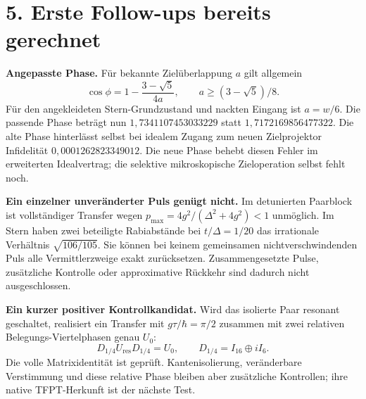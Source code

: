 \documentclass[11pt,a4paper,oneside,parskip=half,headings=normal]{scrreprt}
\begin{document}
\section*{5. Erste Follow-ups bereits gerechnet}
\textbf{Angepasste Phase.} Für bekannte Zielüberlappung $a$ gilt allgemein
\begin{equation}
\cos\phi=1-\frac{3-\sqrt5}{4a},\qquad
a\ge(3-\sqrt5)/8.
\end{equation}
Für den angekleideten Stern-Grundzustand und nackten Eingang ist $a=w/6$. Die passende Phase beträgt nun $1{,}7341107453033229$ statt $1{,}7172169856477322$. Die alte Phase hinterlässt selbst bei idealem Zugang zum neuen Zielprojektor Infidelität $0{,}0001262823349012$. Die neue Phase behebt diesen Fehler im erweiterten Idealvertrag; die selektive mikroskopische Zieloperation selbst fehlt noch.

\textbf{Ein einzelner unveränderter Puls genügt nicht.} Im detunierten Paarblock ist vollständiger Transfer wegen $p_{\max}=4g^2/(\Delta^2+4g^2)<1$ unmöglich. Im Stern haben zwei beteiligte Rabiabstände bei $t/\Delta=1/20$ das irrationale Verhältnis $\sqrt{106/105}$. Sie können bei keinem gemeinsamen nichtverschwindenden Puls alle Vermittlerzweige exakt zurücksetzen. Zusammengesetzte Pulse, zusätzliche Kontrolle oder approximative Rückkehr sind dadurch nicht ausgeschlossen.

\textbf{Ein kurzer positiver Kontrollkandidat.} Wird das isolierte Paar resonant geschaltet, realisiert ein Transfer mit $g\tau/\hbar=\pi/2$ zusammen mit zwei relativen Belegungs-Viertelphasen genau $U_0$:
\[
D_{1/4}U_{\mathrm{res}}D_{1/4}=U_0,\qquad D_{1/4}=I_{16}\oplus iI_6.
\]
Die volle Matrixidentität ist geprüft. Kantenisolierung, veränderbare Verstimmung und diese relative Phase bleiben aber zusätzliche Kontrollen; ihre native TFPT-Herkunft ist der nächste Test.
\end{document}
